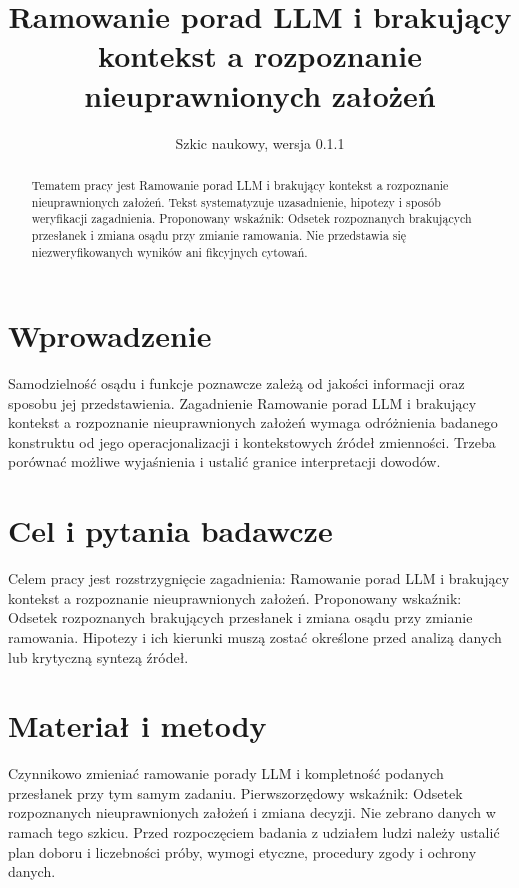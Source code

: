 \documentclass[11pt,a4paper]{article}
\title{Ramowanie porad LLM i brakujący kontekst a rozpoznanie nieuprawnionych założeń}
\author{}
\date{Szkic naukowy, wersja 0.1.1}
\begin{document}
\maketitle

\begin{abstract}

Tematem pracy jest Ramowanie porad LLM i brakujący kontekst a rozpoznanie nieuprawnionych założeń. Tekst systematyzuje uzasadnienie, hipotezy i sposób weryfikacji zagadnienia. Proponowany wskaźnik: Odsetek rozpoznanych brakujących przesłanek i zmiana osądu przy zmianie ramowania. Nie przedstawia się niezweryfikowanych wyników ani fikcyjnych cytowań.

\end{abstract}

\section{Wprowadzenie}

Samodzielność osądu i funkcje poznawcze zależą od jakości informacji oraz sposobu jej przedstawienia. Zagadnienie Ramowanie porad LLM i brakujący kontekst a rozpoznanie nieuprawnionych założeń wymaga odróżnienia badanego konstruktu od jego operacjonalizacji i kontekstowych źródeł zmienności. Trzeba porównać możliwe wyjaśnienia i ustalić granice interpretacji dowodów.

\section{Cel i pytania badawcze}

Celem pracy jest rozstrzygnięcie zagadnienia: Ramowanie porad LLM i brakujący kontekst a rozpoznanie nieuprawnionych założeń. Proponowany wskaźnik: Odsetek rozpoznanych brakujących przesłanek i zmiana osądu przy zmianie ramowania. Hipotezy i ich kierunki muszą zostać określone przed analizą danych lub krytyczną syntezą źródeł.

\section{Materiał i metody}

Czynnikowo zmieniać ramowanie porady LLM i kompletność podanych przesłanek przy tym samym zadaniu. Pierwszorzędowy wskaźnik: Odsetek rozpoznanych nieuprawnionych założeń i zmiana decyzji. Nie zebrano danych w ramach tego szkicu. Przed rozpoczęciem badania z udziałem ludzi należy ustalić plan doboru i liczebności próby, wymogi etyczne, procedury zgody i ochrony danych.
\end{document}
